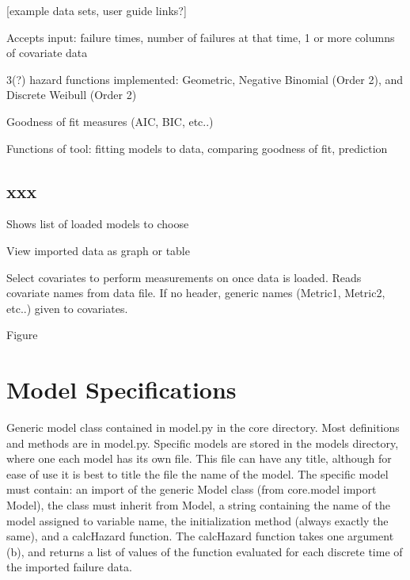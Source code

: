 \documentclass[conference]{IEEEtran}
\begin{document}
[example data sets, user guide links?]

Accepts input: failure times, number of failures at that time, 1 or more columns of covariate data

3(?) hazard functions implemented: Geometric, Negative Binomial (Order 2), and Discrete Weibull (Order 2)

Goodness of fit measures (AIC, BIC, etc..)

Functions of tool: fitting models to data, comparing goodness of fit, prediction

\subsection{xxx}\label{sec:Tab1}
Shows list of loaded models to choose

View imported data as graph or table

Select covariates to perform measurements on once data is loaded. Reads covariate names from data file. If no header, generic names (Metric1, Metric2, etc..) given to covariates. 

Figure



\section{Model Specifications}\label{sec:Specs}
Generic model class contained in model.py in the core directory. Most definitions and methods are in model.py. Specific models are stored in the models directory, where one each model has its own file. This file can have any title, although for ease of use it is best to title the file the name of the model. The specific model must contain: an import of the generic Model class (from core.model import Model), the class must inherit from Model, a string containing the name of the model assigned to variable name, the initialization method (always exactly the same), and a calcHazard function. The calcHazard function takes one argument (b), and returns a list of values of the function evaluated for each discrete time of the imported failure data. 


\end{document}
